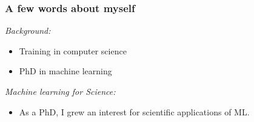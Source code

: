 \documentclass{beamer}
\begin{document}
\begin{frame}
    \frametitle{A few words about myself}

    {\it Background:}
    \begin{itemize}
        \item Training in computer science
        \item PhD in machine learning
    \end{itemize}

    {\it Machine learning for Science:}
    \begin{itemize}
        \item As a PhD, I grew an interest for scientific applications of ML.
    \end{itemize}

    \vspace{0.5cm}


\end{frame}
\end{document}
